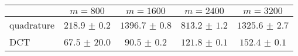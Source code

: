 \centering
\renewcommand{\arraystretch}{1.2}
\begin{tabular}{@{}lcccc@{}}
\toprule
 & $m=800$ & $m=1600$ & $m=2400$ & $m=3200$\\
\midrule
quadrature & $218.9$ $\pm$ $0.2$ & $1396.7$ $\pm$ $0.8$ & $813.2$ $\pm$ $1.2$ & $1325.6$ $\pm$ $2.7$ \\
DCT & $67.5$ $\pm$ $20.0$ & $90.5$ $\pm$ $0.2$ & $121.8$ $\pm$ $0.1$ & $152.4$ $\pm$ $0.1$ \\
\bottomrule
\end{tabular}

